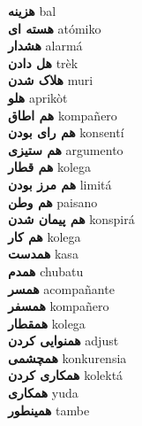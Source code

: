 \textbf{ هزینه  } bal \\
\textbf{ هسته ای  } atómiko \\
\textbf{ هشدار  } alarmá \\
\textbf{ هل دادن  } trèk \\
\textbf{ هلاک شدن  } muri \\
\textbf{ هلو  } aprikòt \\
\textbf{ هم اطاق  } kompañero \\
\textbf{ هم رای بودن  } konsentí \\
\textbf{ هم ستیزی  } argumento \\
\textbf{ هم قطار  } kolega \\
\textbf{ هم مرز بودن  } limitá \\
\textbf{ هم وطن  } paisano \\
\textbf{ هم پیمان شدن  } konspirá \\
\textbf{ هم کار  } kolega \\
\textbf{ همدست  } kasa \\
\textbf{ همدم  } chubatu \\
\textbf{ همسر  } acompañante \\
\textbf{ همسفر  } kompañero \\
\textbf{ همقطار  } kolega \\
\textbf{ همنوایی کردن  } adjust \\
\textbf{ همچشمی  } konkurensia \\
\textbf{ همکاری کردن  } kolektá \\
\textbf{ همکاری  } yuda \\
\textbf{ همینطور  } tambe \\
